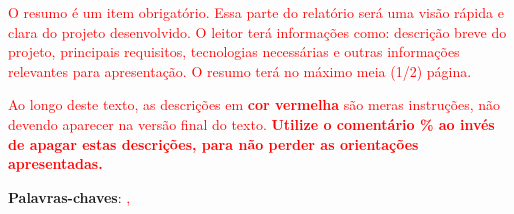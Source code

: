 \begin{resumo}
\textcolor{red}{O resumo é um item obrigatório. Essa parte do relatório será uma visão rápida e clara do projeto desenvolvido. O leitor terá informações como: descrição breve do projeto, principais requisitos, tecnologias necessárias e outras informações relevantes para apresentação. O resumo terá no máximo meia (1/2) página.}

\textcolor{red}{Ao longo deste texto, as descrições em \textbf{cor vermelha} são meras instruções, não devendo aparecer na versão final do texto. \textbf{Utilize o comentário \% ao invés de apagar estas descrições, para não perder as orientações apresentadas.}}

\vspace{\onelineskip}
\noindent
\textbf{Palavras-chaves}: \textcolor{red}{ \imprimirpalavrachaveum, \imprimirpalavrachavedois}
\end{resumo}


    
